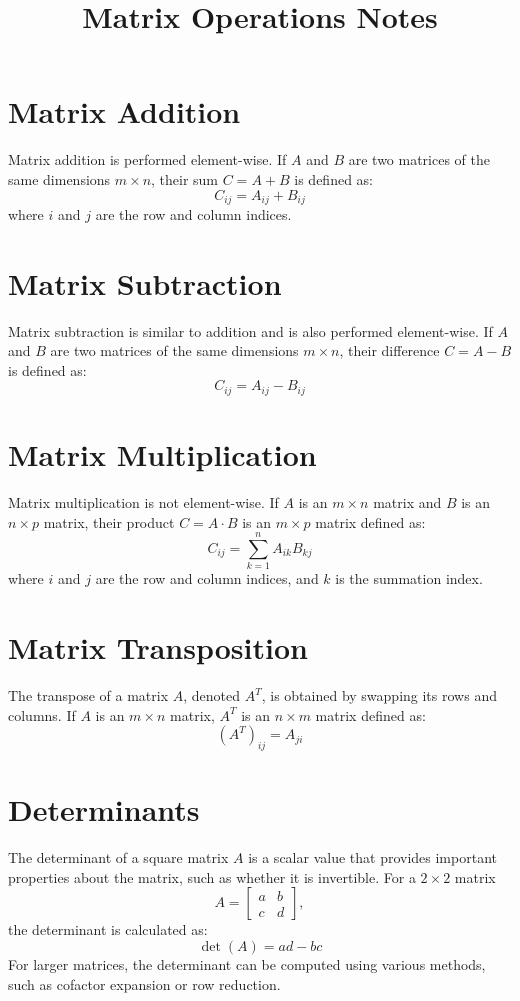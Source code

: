 \documentclass{article}
\title{Matrix Operations Notes}
\author{}
\date{}
\begin{document}
\maketitle

\section{Matrix Addition}
Matrix addition is performed element-wise. If \( A \) and \( B \) are two matrices of the same dimensions \( m \times n \), their sum \( C = A + B \) is defined as:
\[
C_{ij} = A_{ij} + B_{ij}
\]
where \( i \) and \( j \) are the row and column indices.

\section{Matrix Subtraction}
Matrix subtraction is similar to addition and is also performed element-wise. If \( A \) and \( B \) are two matrices of the same dimensions \( m \times n \), their difference \( C = A - B \) is defined as:
\[
C_{ij} = A_{ij} - B_{ij}
\]

\section{Matrix Multiplication}
Matrix multiplication is not element-wise. If \( A \) is an \( m \times n \) matrix and \( B \) is an \( n \times p \) matrix, their product \( C = A \cdot B \) is an \( m \times p \) matrix defined as:
\[
C_{ij} = \sum_{k=1}^{n} A_{ik} B_{kj}
\]
where \( i \) and \( j \) are the row and column indices, and \( k \) is the summation index.

\section{Matrix Transposition}
The transpose of a matrix \( A \), denoted \( A^T \), is obtained by swapping its rows and columns. If \( A \) is an \( m \times n \) matrix, \( A^T \) is an \( n \times m \) matrix defined as:
\[
(A^T)_{ij} = A_{ji}
\]

\section{Determinants}
The determinant of a square matrix \( A \) is a scalar value that provides important properties about the matrix, such as whether it is invertible. For a \( 2 \times 2 \) matrix 
\[
A = \begin{bmatrix}
a & b \\
c & d
\end{bmatrix},
\]
the determinant is calculated as:
\[
\det(A) = ad - bc
\]
For larger matrices, the determinant can be computed using various methods, such as cofactor expansion or row reduction.
\end{document}
